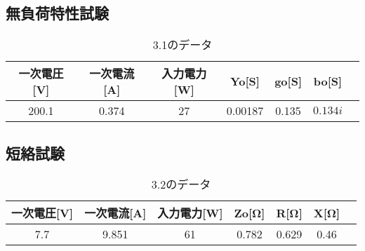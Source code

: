 \documentclass[a4paper,11pt,xelatex,ja=standard]{bxjsarticle}
\begin{document}
            \subsection{無負荷特性試験}
                \begin{table}[H]
                    \centering
                    \begin{tabular}{|c|c|c|c|c|c|c|}
                    \hline
                    一次電圧[V] & 一次電流[A] & 入力電力[W] & Yo[S] & go[S] & bo[S] \\
                    \hline
                    200.1 & 0.374 & 27 & 0.00187 & 0.135 & $0.134i$ \\
                    \hline
                    \end{tabular}
                    \caption{3.1のデータ}
                \end{table}

            \subsection{短絡試験}
                \begin{table}[H]
                    \centering
                    \begin{tabular}{|c|c|c|c|c|c|c|}
                    \hline
                    一次電圧[V] & 一次電流[A] & 入力電力[W] & Zo[Ω] & R[Ω] & X[Ω] \\
                    \hline
                    7.7 & 9.851 & 61 & 0.782 & 0.629 & 0.46 \\
                    \hline
                    \end{tabular}
                \caption{3.2のデータ}
                \end{table}
\end{document}
